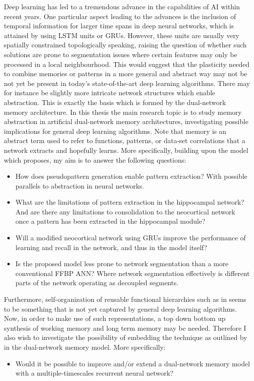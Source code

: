 Deep learning has led to a tremendous advance in the capabilities of AI within recent years. One particular aspect leading to the advances is the inclusion of temporal information for larger time spans in deep neural networks, which is attained by using LSTM units or GRUs. However, these units are usually very spatially constrained topologically speaking, raising the question of whether such solutions are prone to segmentation issues where certain features may only be processed in a local neighbourhood. This would suggest that the plasticity needed to combine memories or patterns in a more general and abstract way may not be not yet be present in today's state-of-the-art deep learning algorithms. There may for instance be slightly more intricate network structures which enable abstraction. This is exactly the basis which is formed by the dual-network memory architecture. 
In this thesis the main research topic is to study memory abstraction in artificial dual-network memory architectures, investigating possible implications for general deep learning algorithms. Note that memory is an abstract term used to refer to functions, patterns, or data-set correlations that a network extracts and hopefully learns. More specifically, building upon the model which \cite{Hattori2014} proposes, my aim is to answer the following questions:
\begin{itemize}
\item How does pseudopattern generation enable pattern extraction? With possible parallels to abstraction in neural networks.
\item What are the limitations of pattern extraction in the hippocampal network? And are there any limitations to consolidation to the neocortical network once a pattern has been extracted in the hippocampal module?
\item Will a modified neocortical network using GRUs improve the performance of learning and recall in the network, and thus in the model itself?
\item Is the proposed model less prone to network segmentation than a more conventional FFBP ANN? Where network segmentation effectively is different parts of the network operating as decoupled segments.
\end{itemize}

Furthermore, self-organization of reusable functional hierarchies such as in \citep{Tani2014} seems to be something that is not yet captured by general deep learning algorithms. Now, in order to make use of such representations, a top down bottom up synthesis of working memory and long term memory may be needed. Therefore I also wish to investigate the possibility of embedding the technique as outlined by \cite{Tani2014} in the dual-network memory model. More specifically:
\begin{itemize}
\item Would it be possible to improve and/or extend a dual-network memory model with a multiple-timescales recurrent neural network?
\end{itemize}

